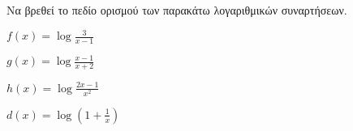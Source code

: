 Να βρεθεί το πεδίο ορισμού των παρακάτω λογαριθμικών συναρτήσεων.
\begin{rlist}
\item $ f(x)=\log{\frac{3}{x-1}} $
\item $ g(x)=\log{\frac{x-1}{x+2}} $
\item $ h(x)=\log{\frac{2x-1}{x^2}} $
\item $ d(x)=\log{\left( 1+\frac{1}{x}\right) } $
\end{rlist}
